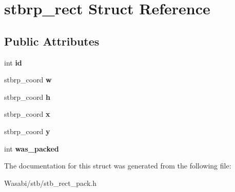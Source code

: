 \hypertarget{structstbrp__rect}{}\section{stbrp\+\_\+rect Struct Reference}
\label{structstbrp__rect}
\subsection*{Public Attributes}
\begin{DoxyCompactItemize}
\item 
int {\bfseries id}\hypertarget{structstbrp__rect_a92da8626bc99df041c0c3bfd01c25f7a}{}\label{structstbrp__rect_a92da8626bc99df041c0c3bfd01c25f7a}

\item 
stbrp\+\_\+coord {\bfseries w}\hypertarget{structstbrp__rect_a248d43f1eb979c1e7b92ba6df431dec5}{}\label{structstbrp__rect_a248d43f1eb979c1e7b92ba6df431dec5}

\item 
stbrp\+\_\+coord {\bfseries h}\hypertarget{structstbrp__rect_af68de2dadc7972b7c089d5e0c0558398}{}\label{structstbrp__rect_af68de2dadc7972b7c089d5e0c0558398}

\item 
stbrp\+\_\+coord {\bfseries x}\hypertarget{structstbrp__rect_a4cc623a3e29f0bc0d3375f6645c84d18}{}\label{structstbrp__rect_a4cc623a3e29f0bc0d3375f6645c84d18}

\item 
stbrp\+\_\+coord {\bfseries y}\hypertarget{structstbrp__rect_ae3034c1fbf86043b568f5a4dddf946fa}{}\label{structstbrp__rect_ae3034c1fbf86043b568f5a4dddf946fa}

\item 
int {\bfseries was\+\_\+packed}\hypertarget{structstbrp__rect_a74ba347755ce17f2f8a2ea66c612af49}{}\label{structstbrp__rect_a74ba347755ce17f2f8a2ea66c612af49}

\end{DoxyCompactItemize}


The documentation for this struct was generated from the following file\+:\begin{DoxyCompactItemize}
\item 
Wasabi/stb/stb\+\_\+rect\+\_\+pack.\+h\end{DoxyCompactItemize}
